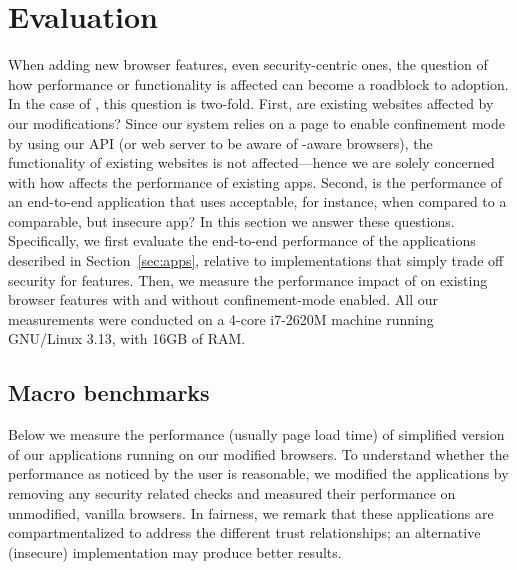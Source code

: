 \section{Evaluation}
\label{sec:eval}

When adding new browser features, even security-centric ones, the
question of how performance or functionality is affected can become a
roadblock to adoption.
%
In the case of \sys{}, this question is two-fold.
%
First, are existing websites affected by our modifications?
%
Since our system relies on a page to enable confinement mode by using
our API (or web server to be aware of \sys{}-aware browsers), the
functionality of existing websites is not affected---hence we are
solely concerned with how \sys{} affects the performance of existing
apps.
%
Second, is the performance of an end-to-end application that uses
\sys{} acceptable, for instance, when compared to a comparable, but
insecure app?
%
In this section we answer these questions.
%
Specifically, we first evaluate the end-to-end performance of the
applications described in Section~\ref{sec:apps}, relative to
implementations that simply trade off security for features.
%
Then, we measure the performance impact of \sys{} on existing browser
features with and without confinement-mode enabled.
%
All our measurements were conducted on a 4-core i7-2620M machine
running GNU/Linux 3.13, with 16GB of RAM.
%


\subsection{Macro benchmarks}
\label{sec:eval:macro}

Below we measure the performance (usually page load time) of
simplified version of our applications running on our modified
browsers.
%
To understand whether the performance as noticed by the user is
reasonable, we modified the applications by removing any security
related checks and measured their performance on unmodified, vanilla
browsers.
%
In fairness, we remark that these applications are compartmentalized
to address the different trust relationships; an alternative
(insecure) implementation may produce better results.

